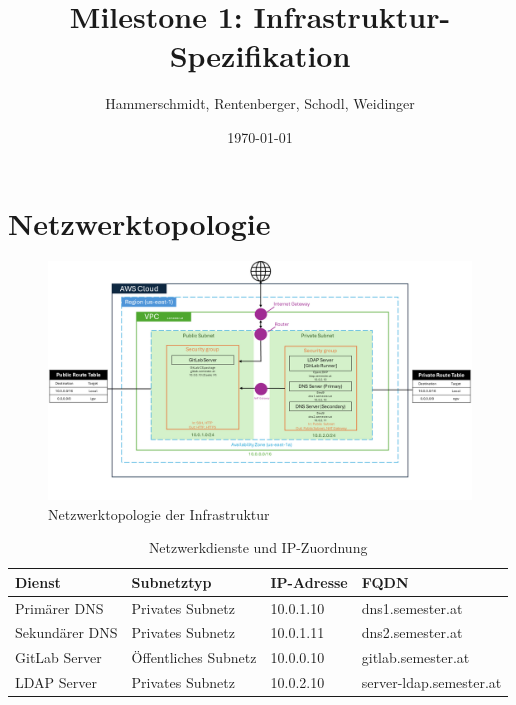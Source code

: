 \documentclass[a4paper,12pt]{article}
\title{Milestone 1: Infrastruktur-Spezifikation}
\author{Hammerschmidt, Rentenberger, Schodl, Weidinger}
\date{\today}
\begin{document}
\maketitle
\tableofcontents
\newpage

\section{Netzwerktopologie}

\begin{figure}[h!]
    \centering
    \includegraphics[width=\textwidth]{data/DevOps_Network_Topology.png}
    \caption{Netzwerktopologie der Infrastruktur}
    \label{fig:network_topology}
\end{figure}

\begin{table}[h!]
    \centering
    \begin{tabular}{|l|l|l|l|}
    \hline
    \textbf{Dienst}          & \textbf{Subnetztyp}      & \textbf{IP-Adresse} & \textbf{FQDN}             \\ \hline
    Primärer DNS             & Privates Subnetz         & 10.0.1.10                & dns1.semester.at         \\ \hline
    Sekundärer DNS           & Privates Subnetz         & 10.0.1.11                & dns2.semester.at         \\ \hline
    GitLab Server            & Öffentliches Subnetz     & 10.0.0.10                & gitlab.semester.at       \\ \hline
    LDAP Server              & Privates Subnetz         & 10.0.2.10                & server-ldap.semester.at         \\ \hline
    \end{tabular}
    \caption{Netzwerkdienste und IP-Zuordnung}
\end{table}
\end{document}
